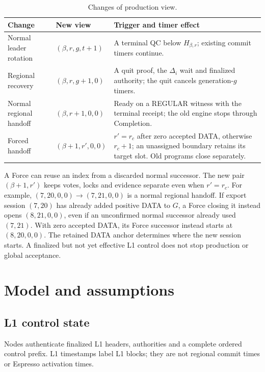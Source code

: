 \documentclass[11pt,a4paper]{article}
\begin{document}
\begin{table}[htbp]\centering\small
\caption{Changes of production view.}\label{tab:views}
\begin{tabularx}{\linewidth}{@{}>{\raggedright\arraybackslash}p{.19\linewidth}>{\raggedright\arraybackslash}p{.25\linewidth}Y@{}}\toprule
Change & New view & Trigger and timer effect\\\midrule
Normal leader rotation & $(\beta,r,g,t+1)$ & A terminal QC below $H_{\beta,r}$;
existing commit timers continue.\\
Regional recovery & $(\beta,r,g+1,0)$ & A quit proof, the $\Delta_i$ wait
and finalized authority; the quit cancels generation-$g$ timers.\\
Normal regional handoff & $(\beta,r+1,0,0)$ & Ready on a REGULAR witness
with the terminal receipt; the old engine stops through Completion.\\
Forced handoff & $(\beta+1,r',0,0)$ & $r'=r_c$ after zero accepted DATA,
otherwise $r_c+1$; an unassigned boundary retains its target slot.
Old programs close separately.\\
\bottomrule\end{tabularx}
\end{table}

A Force can reuse an index from a discarded normal successor.
The new pair $(\beta+1,r')$ keeps votes, locks and evidence separate even when $r'=r_c$.
For example, $(7,20,0,0)\to(7,21,0,0)$ is a normal regional
handoff. If export session $(7,20)$ has already added positive DATA to $G$,
a Force closing it instead opens $(8,21,0,0)$, even if an unconfirmed
normal successor already used $(7,21)$. With zero accepted DATA, its
Force successor instead starts at $(8,20,0,0)$. The retained DATA anchor determines where the new session starts.
A finalized but not yet effective L1 control does not stop production
or global acceptance.

\section{Model and assumptions}
\label{sec:model}
\subsection{L1 control state}
\label{sec:l1}
Nodes authenticate finalized L1 headers, authorities and a complete
ordered control prefix. L1 timestamps label L1 blocks; they are not
regional commit times or Espresso activation times.
\end{document}
